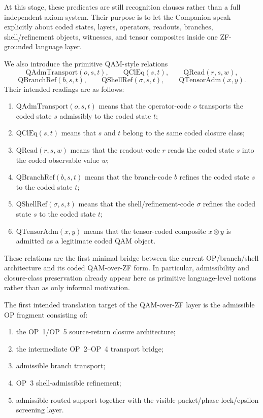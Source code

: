 \begin{remark}
At this stage, these predicates are still recognition clauses rather than a full independent axiom system. Their purpose is to let the Companion speak explicitly about coded states, layers, operators, readouts, branches, shell/refinement objects, witnesses, and tensor composites inside one ZF-grounded language layer.
\end{remark}

\begin{definition}
We also introduce the primitive QAM-style relations
\[
\mathrm{QAdmTransport}(o,s,t),\qquad
\mathrm{QClEq}(s,t),\qquad
\mathrm{QRead}(r,s,w),
\]
\[
\mathrm{QBranchRef}(b,s,t),\qquad
\mathrm{QShellRef}(\sigma,s,t),\qquad
\mathrm{QTensorAdm}(x,y).
\]
Their intended readings are as follows:
\begin{enumerate}
\item $\mathrm{QAdmTransport}(o,s,t)$ means that the operator-code $o$ transports the coded state $s$ admissibly to the coded state $t$;
\item $\mathrm{QClEq}(s,t)$ means that $s$ and $t$ belong to the same coded closure class;
\item $\mathrm{QRead}(r,s,w)$ means that the readout-code $r$ reads the coded state $s$ into the coded observable value $w$;
\item $\mathrm{QBranchRef}(b,s,t)$ means that the branch-code $b$ refines the coded state $s$ to the coded state $t$;
\item $\mathrm{QShellRef}(\sigma,s,t)$ means that the shell/refinement-code $\sigma$ refines the coded state $s$ to the coded state $t$;
\item $\mathrm{QTensorAdm}(x,y)$ means that the tensor-coded composite $x\otimes y$ is admitted as a legitimate coded QAM object.
\end{enumerate}
\end{definition}

\begin{remark}
These relations are the first minimal bridge between the current OP/branch/shell architecture and its coded QAM-over-ZF form. In particular, admissibility and closure-class preservation already appear here as primitive language-level notions rather than as only informal motivation.
\end{remark}

\begin{definition}
The first intended translation target of the QAM-over-ZF layer is the admissible OP fragment consisting of:
\begin{enumerate}
\item the OP~1/OP~5 source-return closure architecture;
\item the intermediate OP~2--OP~4 transport bridge;
\item admissible branch transport;
\item OP~3 shell-admissible refinement;
\item admissible routed support together with the visible packet/phase-lock/epsilon screening layer.
\end{enumerate}
\end{definition}

